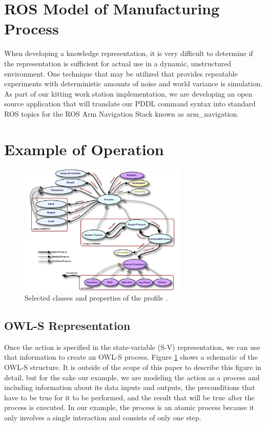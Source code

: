 \documentclass[a4paper, 10pt, conference]{ieeeconf}      %
\begin{document}
\section{ROS Model of Manufacturing Process}
\label{sect:ROS}
When developing a knowledge representation, it is very difficult to determine if the representation is sufficient for actual use in a dynamic, unstructured environment.
One technique that may be utilized that provides repeatable experiments with deterministic amounts of noise and world variance is simulation. As part of our kitting work
station implementation, we are developing an open source application that will translate our PDDL command syntax into standard ROS topics for the ROS Arm Navigation
Stack known as arm\_navigation.

\section{Example of Operation}
\label{sect:Example}
\begin{figure}[htb]
\includegraphics[width=8cm]{images/OWL-S.jpg}
\caption{Selected classes and properties of the profile \cite{OWL-S}.}
\label{fig:OWL-S}
\end{figure}
\subsection{OWL-S Representation}
Once the action is specified in the state-variable (S-V) representation, we can use that information to create an OWL-S process. Figure \ref{fig:OWL-S} shows a schematic of the OWL-S structure. It is outside of the scope of this paper to describe this figure in detail, but for the sake our example, we are modeling the action as a process and including information about its data inputs and outputs, the preconditions that have to be true for it to be performed, and the result that will be true after the process is executed. In our example, the process is an atomic process because it only involves a single interaction and consists of only one step.
\end{document}
